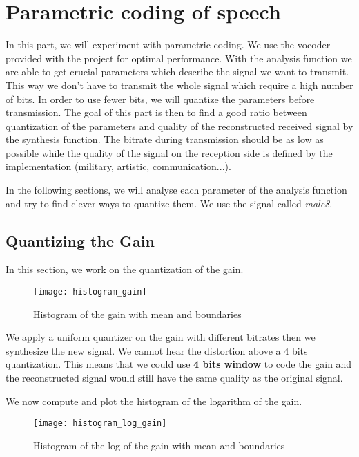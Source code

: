 \section{Parametric coding of speech}

In this part, we will experiment with parametric coding. We use the vocoder provided with the project for optimal performance.
With the analysis function we are able to get crucial parameters which describe the signal we want to transmit. This way we don't have to
transmit the whole signal which require a high number of bits. In order to use fewer bits, we will quantize the parameters before transmission.
The goal of this part is then to find a good ratio between quantization of the parameters and quality of the reconstructed received signal by
the synthesis function. The bitrate during transmission should be as low as possible while the quality of the signal on the reception side is
defined by the implementation (military, artistic, communication...).

In the following sections, we will analyse each parameter of the analysis function and try to find clever ways to quantize them.
We use the signal called \textit{male8}.

\subsection{Quantizing the Gain}

In this section, we work on the quantization of the gain.

\begin{figure}[h!]
\centering
\texttt{[image: histogram\_gain]}
\caption{Histogram of the gain with mean and boundaries}
\label{histgain}
\end{figure}

We apply a uniform quantizer on the gain with different bitrates then we synthesize the new signal. We cannot hear the distortion
above a 4 bits quantization. This means that we could use \textbf{4 bits window} to code the gain and the reconstructed signal would still have the same
quality as the original signal. 

We now compute and plot the histogram of the logarithm of the gain.

\begin{figure}[h!]
\centering
\texttt{[image: histogram\_log\_gain]}
\caption{Histogram of the log of the gain with mean and boundaries}
\label{histloggain}
\end{figure}

